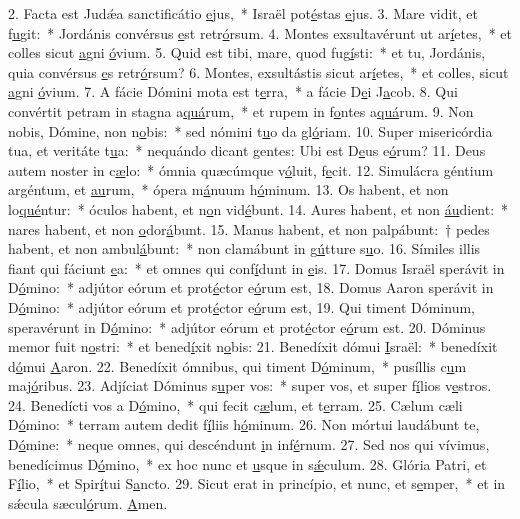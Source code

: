2. Facta est Judǽa sanctificátio \uline{e}jus,~* Israël pot\uline{é}stas \uline{e}jus.
3. Mare vidit, et f\uline{u}git:~* Jordánis convérsus \uline{e}st retr\uline{ó}rsum.
4. Montes exsultavérunt ut ar\uline{í}etes,~* et colles sicut \uline{a}gni \uline{ó}vium.
5. Quid est tibi, mare, quod fug\uline{í}sti:~* et tu, Jordánis, quia convérsus \uline{e}s retr\uline{ó}rsum?
6. Montes, exsultástis sicut ar\uline{í}etes,~* et colles, sicut \uline{a}gni \uline{ó}vium.
7. A fácie Dómini mota est t\uline{e}rra,~* a fácie D\uline{e}i J\uline{a}cob.
8. Qui convértit petram in stagna a\uline{quá}rum,~* et rupem in f\uline{o}ntes a\uline{quá}rum.
9. Non nobis, Dómine, non n\uline{o}bis:~* sed nómini t\uline{u}o da gl\uline{ó}riam.
10. Super misericórdia tua, et veritáte t\uline{u}a:~* nequándo dicant gentes: Ubi est D\uline{e}us e\uline{ó}rum?
11. Deus autem noster in c\uline{æ}lo:~* ómnia quæcúmque v\uline{ó}luit, f\uline{e}cit.
12. Simulácra géntium argéntum, et \uline{au}rum,~* ópera m\uline{á}nuum h\uline{ó}minum.
13. Os habent, et non lo\uline{qué}ntur:~* óculos habent, et n\uline{o}n vid\uline{é}bunt.
14. Aures habent, et non \uline{áu}dient:~* nares habent, et non \uline{o}dor\uline{á}bunt.
15. Manus habent, et non palpábunt:~† pedes habent, et non ambul\uline{á}bunt:~* non clamábunt in g\uline{ú}tture s\uline{u}o.
16. Símiles illis fiant qui fáciunt \uline{e}a:~* et omnes qui conf\uline{í}dunt in \uline{e}is.
17. Domus Israël sperávit in D\uline{ó}mino:~* adjútor eórum et prot\uline{é}ctor e\uline{ó}rum est,
18. Domus Aaron sperávit in D\uline{ó}mino:~* adjútor eórum et prot\uline{é}ctor e\uline{ó}rum est,
19. Qui timent Dóminum, speravérunt in D\uline{ó}mino:~* adjútor eórum et prot\uline{é}ctor e\uline{ó}rum est.
20. Dóminus memor fuit n\uline{o}stri:~* et bened\uline{í}xit n\uline{o}bis:
21. Benedíxit dómui \uline{I}sraël:~* benedíxit d\uline{ó}mui \uline{A}aron.
22. Benedíxit ómnibus, qui timent D\uline{ó}minum,~* pusíllis c\uline{u}m maj\uline{ó}ribus.
23. Adjíciat Dóminus s\uline{u}per vos:~* super vos, et super f\uline{í}lios v\uline{e}stros.
24. Benedícti vos a D\uline{ó}mino,~* qui fecit c\uline{æ}lum, et t\uline{e}rram.
25. Cælum cæli D\uline{ó}mino:~* terram autem dedit f\uline{í}liis h\uline{ó}minum.
26. Non mórtui laudábunt te, D\uline{ó}mine:~* neque omnes, qui descéndunt \uline{i}n inf\uline{é}rnum.
27. Sed nos qui vívimus, benedícimus D\uline{ó}mino,~* ex hoc nunc et \uline{u}sque in s\uline{ǽ}culum.
28. Glória Patri, et F\uline{í}lio,~* et Spir\uline{í}tui S\uline{a}ncto.
29. Sicut erat in princípio, et nunc, et s\uline{e}mper,~* et in sǽcula sæcul\uline{ó}rum. \uline{A}men.
